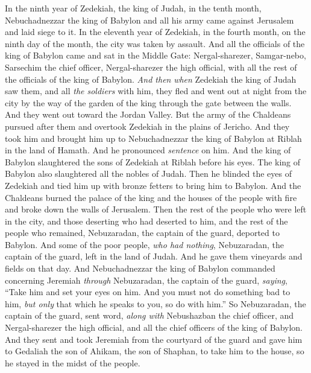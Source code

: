 \begin{biblechapter} %
 In the ninth year of Zedekiah, the king of Judah, in the tenth month, Nebuchadnezzar the king of Babylon and all his army came against Jerusalem and laid siege to it.
\verse In the eleventh year of Zedekiah, in the fourth month, on the ninth day of the month, the city was taken by assault.
\verse And all the officials of the king of Babylon came and sat in the Middle Gate: Nergal-sharezer, Samgar-nebo, Sarsechim the chief officer, Nergal-sharezer the high official, with all the rest of the officials of the king of Babylon.
\verse \textit{And then} \textit{when} Zedekiah the king of Judah saw them, and all \textit{the soldiers} with him, they fled and went out at night from the city by the way of the garden of the king through the gate between the walls. And they went out toward the Jordan Valley.
\verse But the army of the Chaldeans pursued after them and overtook Zedekiah in the plains of Jericho. And they took him and brought him up to Nebuchadnezzar the king of Babylon at Riblah in the land of Hamath. And he pronounced \textit{sentence} on him.
\verse And the king of Babylon slaughtered the sons of Zedekiah at Riblah before his eyes. The king of Babylon also slaughtered all the nobles of Judah.
\verse Then he blinded the eyes of Zedekiah and tied him up with bronze fetters to bring him to Babylon.
\verse And the Chaldeans burned the palace of the king and the houses of the people with fire and broke down the walls of Jerusalem.
\verse Then the rest of the people who were left in the city, and those deserting who had deserted to him, and the rest of the people who remained, Nebuzaradan, the captain of the guard, deported to Babylon.
\verse And some of the poor people, \textit{who had nothing}, Nebuzaradan, the captain of the guard, left in the land of Judah. And he gave them vineyards and fields on that day.
\verse And Nebuchadnezzar the king of Babylon commanded concerning Jeremiah \textit{through} Nebuzaradan, the captain of the guard, \textit{saying},
\verse “Take him and set your eyes on him. And you must not do something bad to him, \textit{but only} that which he speaks to you, so do with him.”
\verse So Nebuzaradan, the captain of the guard, sent word, \textit{along with} Nebushazban the chief officer, and Nergal-sharezer the high official, and all the chief officers of the king of Babylon.
\verse And they sent and took Jeremiah from the courtyard of the guard and gave him to Gedaliah the son of Ahikam, the son of Shaphan, to take him to the house, so he stayed in the midst of the people.

\end{biblechapter}
